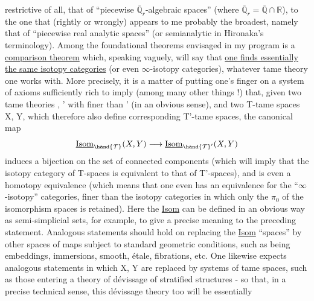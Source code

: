 
restrictive of all, that of ``piecewise $\bar{\mathbb{Q}}_r$-algebraic spaces''
(where $\bar{\mathbb{Q}}_r = \bar{\mathbb{Q}} \cap \mathbb{R}$), to the one that (rightly or wrongly) appears to me
probably the broadest, namely that of ``piecewise real analytic
spaces'' (or semianalytic in Hironaka's terminology).
Among the foundational theorems envisaged
in my program is a \uline{comparison theorem} which, speaking
vaguely, will say that \uline{one finds essentially the same isotopy
categories} (or even $\infty$-isotopy categories), whatever
tame theory one works with. More precisely,
it is a matter of putting one's finger on a system of axioms sufficiently
rich to imply (among many other things !) that, given
two tame theories , ' with  finer than ' (in
an obvious sense), and two T-tame spaces X, Y, which
therefore also define corresponding T'-tame spaces,
the canonical map
\[ \underline{\mathrm{Isom}}_{\hand{\mathcal{T}}}(X,Y) \longrightarrow \underline{\mathrm{Isom}}_{\hand{\mathcal{T}}'}(X,Y) \]
induces a bijection on the set of connected components (which
will imply that the isotopy category of T-spaces is equivalent
to that of T'-spaces), and is even a homotopy
equivalence (which means that one even has an equivalence for
the ``$\infty$-isotopy'' categories, finer than the isotopy categories
in which only the $\pi_0$ of the isomorphism spaces is retained).
Here the \uline{Isom} can be defined in an obvious way as
semi-simplicial sets, for example, to give a precise meaning
to the preceding statement. Analogous statements should
hold on replacing the \uline{Isom} ``spaces'' by other spaces of
maps subject to standard geometric conditions, such as
being embeddings, immersions, smooth, étale,
fibrations, etc. One likewise expects analogous
statements in which X, Y are replaced by systems of tame spaces,
such as those entering a theory of dévissage of
stratified structures - so that, in a precise technical
sense, this dévissage theory too will be essentially


